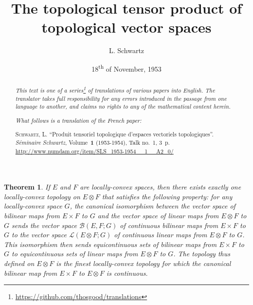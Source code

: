 \documentclass{article}
\title{The topological tensor product of topological vector spaces}
\author{L. Schwartz}
\date{18\textsuperscript{th} of November, 1953}
\theoremstyle{plain}
\newtheorem*{theorem}{Theorem}
\theoremstyle{definition}
\newcommand{\BB}{\mathcal{B}}
\newcommand{\LL}{\mathcal{L}}
\newcommand{\oldpage}[1]{\marginpar{\footnotesize$\Big\vert$ \textit{p.~#1}}}
\begin{document}
\maketitle
\thispagestyle{fancy}

\renewcommand{\abstractname}{Translator's note.}

\begin{abstract}
  \renewcommand*{\thefootnote}{\fnsymbol{footnote}}
  \emph{This text is one of a series\footnote{\url{https://github.com/thosgood/translations}} of translations of various papers into English.}
  \emph{The translator takes full responsibility for any errors introduced in the passage from one language to another, and claims no rights to any of the mathematical content herein.}
  
  \emph{What follows is a translation of the French paper:}

  \medskip\noindent
  \textsc{Schwartz, L.}
  ``Produit tensoriel topologique d'espaces vectoriels topologiques''.
  \emph{S\'{e}minaire Schwartz}, Volume~\textbf{1} (1953-1954), Talk no.~1, 3~p.
  {\footnotesize\url{http://www.numdam.org/item/SLS_1953-1954__1__A2_0/}}
\end{abstract}

\setcounter{footnote}{0}



\oldpage{1}
\begin{theorem}
  If $E$ and $F$ are locally-convex spaces, then there exists exactly one locally-convex topology on $E\otimes F$ that satisfies the following property:
  for any locally-convex space $G$, the canonical isomorphism between the vector space of bilinear maps from $E\times F$ to $G$ and the vector space of linear maps from $E\otimes F$ to $G$ sends the vector space $\BB(E,F;G)$ of continuous bilinear maps from $E\times F$ to $G$ to the vector space $\LL(E\otimes F;G)$ of continuous linear maps from $E\otimes F$ to $G$.
  This isomorphism then sends equicontinuous sets of bilinear maps from $E\times F$ to $G$ to equicontinuous sets of linear maps from $E\otimes F$ to $G$.
  The topology thus defined on $E\otimes F$ is the finest locally-convex topology for which the canonical bilinear map from $E\times F$ to $E\otimes F$ is continuous.
\end{theorem}
\end{document}
